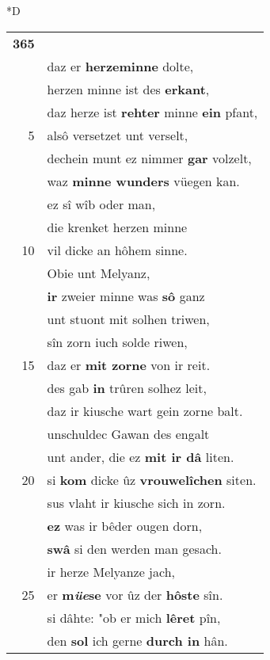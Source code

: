 \documentclass[8pt,a4paper,notitlepage]{article}
\begin{document}
\begin{table}[ht]
\begin{minipage}[t]{0.5\linewidth}
\small
\begin{center}*D
\end{center}
\begin{tabular}{rl}
\textbf{365} & \textit{\begin{large}S\end{large}}wem \textbf{wâriu} \textbf{liebe} ie erholte,\\ 
 & daz er \textbf{herzeminne} dolte,\\ 
 & herzen minne ist des \textbf{erkant},\\ 
 & daz herze ist \textbf{rehter} minne \textbf{ein} pfant,\\ 
5 & alsô versetzet unt verselt,\\ 
 & dechein munt ez nimmer \textbf{gar} volzelt,\\ 
 & waz \textbf{minne wunders} vüegen kan.\\ 
 & ez sî wîb oder man,\\ 
 & die krenket herzen minne\\ 
10 & vil dicke an hôhem sinne.\\ 
 & Obie unt Melyanz,\\ 
 & \textbf{ir} zweier minne was \textbf{sô} ganz\\ 
 & unt stuont mit solhen triwen,\\ 
 & sîn zorn iuch solde riwen,\\ 
15 & daz er \textbf{mit zorne} von ir reit.\\ 
 & des gab \textbf{in} trûren solhez leit,\\ 
 & daz ir kiusche wart gein zorne balt.\\ 
 & unschuldec Gawan des engalt\\ 
 & unt ander, die ez \textbf{mit ir dâ} liten.\\ 
20 & si \textbf{kom} dicke ûz \textbf{vrouwelîchen} siten.\\ 
 & sus vlaht ir kiusche sich in zorn.\\ 
 & \textbf{ez} was ir bêder ougen dorn,\\ 
 & \textbf{swâ} si den werden man gesach.\\ 
 & ir herze Melyanze jach,\\ 
25 & er \textbf{m\textit{üe}se} vor ûz der \textbf{hôste} sîn.\\ 
 & si dâhte: "ob er mich \textbf{lêret} pîn,\\ 
 & den \textbf{sol} ich gerne \textbf{durch in} hân.\\ 

\end{tabular}
\end{minipage}
\end{table}
\end{document}
